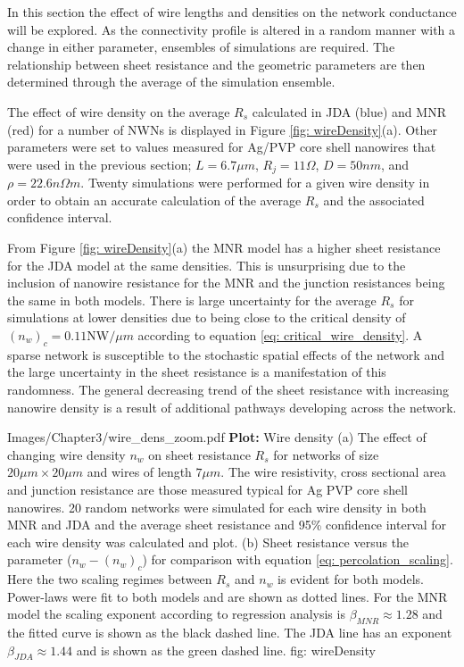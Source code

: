 In this section the effect of wire lengths and densities on the network conductance will be explored. As the connectivity profile is altered in a random manner with a change in either parameter, ensembles of simulations are required. The relationship between sheet resistance and the geometric parameters are then determined through the average of the simulation ensemble.

The effect of wire density on the average $R_s$ calculated in JDA (blue) and MNR (red) for a number of NWNs is displayed in Figure \ref{fig: wireDensity}(a). Other parameters were set to values measured for Ag/PVP core shell nanowires\cite{rocha2015} that were used in the previous section; $L = 6.7 \mu m$, $R_j = 11 \Omega$, $D = 50 n m$, and $\rho = 22.6n\Omega m$. Twenty simulations were performed for a given wire density in order to obtain an accurate calculation of the average $R_s$ and the associated confidence interval. 

From Figure \ref{fig: wireDensity}(a) the MNR model has a higher sheet resistance for the JDA model at the same densities. This is unsurprising due to the inclusion of nanowire resistance for the MNR and the junction resistances being the same in both models. There is large uncertainty for the average $R_s$ for simulations at lower densities due to being close to the critical density of $(n_w)_c = 0.11$NW$/\mu m$ according to equation \ref{eq: critical_wire_density}. A sparse network is susceptible to the stochastic spatial effects of the network and the large uncertainty in the sheet resistance is a manifestation of this randomness. The general decreasing trend of the sheet resistance with increasing nanowire density is a result of additional pathways developing across the network.

{Images/Chapter3/wire_dens_zoom.pdf}
{\textbf{Plot:} Wire density}
{(a) The effect of changing wire density $n_w$ on sheet resistance $R_s$ for networks of size $20\mu m \times 20 \mu m$ and wires of length $7 \mu m$. The wire resistivity, cross sectional area and junction resistance are those measured typical for Ag PVP core shell nanowires. 20 random networks were simulated for each wire density in both MNR and JDA and the average sheet resistance and 95\% confidence interval for each wire density was calculated and plot. (b) Sheet resistance versus the parameter ($n_w - (n_w)_c$) for comparison with equation \ref{eq: percolation_scaling}. Here the two scaling regimes between $R_s$ and $n_w$ is evident for both models. Power-laws were fit to both models and are shown as dotted lines. For the MNR model the scaling exponent according to regression analysis is $\beta_{MNR} \approx 1.28$ and the fitted curve is shown as the black dashed line. The JDA line has an exponent $\beta_{JDA} \approx 1.44$ and is shown as the green dashed line.}
{fig: wireDensity}

